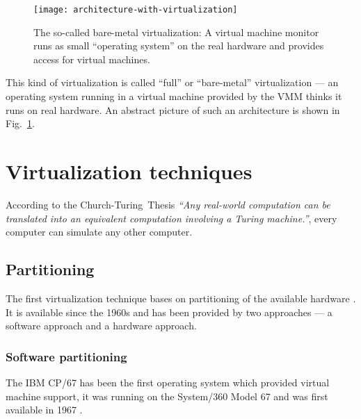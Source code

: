 \begin{figure}[htbp]
  \begin{center}
  \begin{minipage}{0.75\textwidth}
    \begin{center}
      \texttt{[image: architecture-with-virtualization]}
    \end{center}
    \caption[Virtualization   architecture]{The   so-called   bare-metal
      virtualization:   A  virtual   machine  monitor   runs   as  small
      ``operating system'' on the  real hardware and provides access for
      virtual machines.}
    \label{fig:arch-virt}
  \end{minipage}
  \end{center}
\end{figure}

This  kind   of  virtualization  is  called   ``full''  or  ``bare-metal''
virtualization  ---  an operating  system  running  in  a virtual  machine
provided by the  VMM thinks it runs on real  hardware. An abstract picture
of such an architecture is shown in Fig.~\ref{fig:arch-virt}.

\section{Virtualization techniques}
\label{sec:techniques}

According   to    the   Church-Turing~Thesis   \cite{church_turing_thesis}
\emph{``Any real-world  computation can  be translated into  an equivalent
  computation involving  a Turing machine.''}, every  computer can simulate
any other computer.

\bigskip

\subsection{Partitioning}
\label{sec:vt-partitioning}

The first virtualization technique  bases on partitioning of the available
hardware \cite{borden89}.   It is available  since the 1960s and  has been
provided  by  two  approaches  ---  a software  approach  and  a  hardware
approach.

\subsubsection{Software partitioning}
\label{sec:softw-part}

The IBM CP/67  has been the first operating  system which provided virtual
machine support, it  was running on the System/360 Model  67 and was first
available in 1967 \cite{borden89}.

